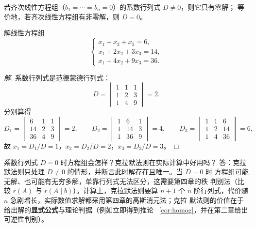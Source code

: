 \begin{corollary}\label{cor:homog}
若齐次线性方程组（$b_1=\cdots=b_n=0$）的系数行列式 $D\neq 0$，则它只有零解；
等价地，若齐次线性方程组有非零解，则 $D=0$。
\end{corollary}

\begin{example}\label{ex:cramer}
解线性方程组
\[
  \begin{cases}
    x_1+x_2+x_3=6, \\
    x_1+2x_2+3x_3=14, \\
    x_1+4x_2+9x_3=36.
  \end{cases}
\]
\end{example}
\begin{proof}[解]
系数行列式是范德蒙德行列式：
\[
  D=\begin{vmatrix} 1 & 1 & 1 \\ 1 & 2 & 3 \\ 1 & 4 & 9 \end{vmatrix}=2 .
\]
分别算得
\[
  D_1=\begin{vmatrix} 6 & 1 & 1 \\ 14 & 2 & 3 \\ 36 & 4 & 9 \end{vmatrix}=2,
  \qquad
  D_2=\begin{vmatrix} 1 & 6 & 1 \\ 1 & 14 & 3 \\ 1 & 36 & 9 \end{vmatrix}=4,
  \qquad
  D_3=\begin{vmatrix} 1 & 1 & 6 \\ 1 & 2 & 14 \\ 1 & 4 & 36 \end{vmatrix}=6,
\]
故 $x_1=D_1/D=1$，$x_2=D_2/D=2$，$x_3=D_3/D=3$。
\end{proof}

\begin{qa}{系数行列式 $D=0$ 时方程组会怎样？克拉默法则在实际计算中好用吗？}
答：克拉默法则只处理 $D\neq0$ 的情形，并断言此时解存在且唯一。当 $D=0$ 时
方程组可能无解、也可能有无穷多解，单靠行列式无法区分，这需要第四章的秩
判别法（比较 $r(A)$ 与 $r(A\mid b)$）。计算上，克拉默法则要算 $n+1$ 个 $n$
阶行列式，代价随 $n$ 急剧增长，实际数值求解都采用第四章的高斯消元法；克拉
默法则的价值在于给出解的\textbf{显式公式}与理论判据（例如立即得到推论
~\ref{cor:homog}，并在第二章给出可逆性判别）。
\end{qa}


